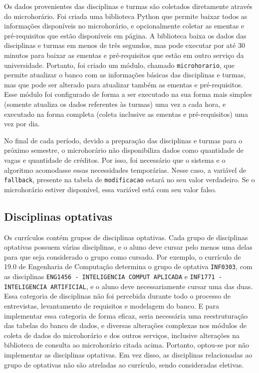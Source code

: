 

Os dados provenientes das disciplinas e turmas são coletados diretamente através do microhorário. Foi criada uma biblioteca Python que permite baixar todos as informações disponíveis no microhorário, e opcionalmente coletar as ementas e pré-requisitos que estão disponíveis em página. A biblioteca baixa os dados das disciplinas e turmas em menos de três segundos, mas pode executar por até 30 minutos para baixar as ementas e pré-requisitos que estão em outro serviço da universidade. Portanto, foi criado um módulo, chamado \verb|microhorario|, que permite atualizar o banco com as informações básicas das disciplinas e turmas, mas que pode ser alterado para atualizar também as ementas e pré-requisitos. Esse módulo foi configurado de forma a ser executado na sua forma mais simples (somente atualiza os dados referentes às turmas) uma vez a cada hora, e executado na forma completa (coleta inclusive as ementas e pré-requisitos) uma vez por dia.

No final de cada período, devido a preparação das disciplinas e turmas para o próximo semestre, o microhorário não disponibiliza dados como quantidade de vagas e quantidade de créditos. Por isso, foi necessário que o sistema e o algoritmo acomodasse essas necessidades temporárias. Nesse caso, a variável de \verb|fallback|, presente na tabela de \verb|modificacao| estará no seu valor verdadeiro. Se o microhorário estiver disponível, essa variável está com seu valor falso.

\subsection{Disciplinas optativas}
Os currículos contém grupos de disciplinas optativas. Cada grupo de disciplinas optativas possuem várias disciplinas, e o aluno deve cursar pelo menos uma delas para que seja considerado o grupo como cursado. Por exemplo, o currículo de 19.0 de Engenharia de Computação determina o grupo de optativa \verb|INF0303|, com as disciplinas \verb|ENG1456 - INTELIGENCIA COMPUT APLICADA| e \verb|INF1771 - INTELIGENCIA ARTIFICIAL|, e o aluno deve necessariamente cursar uma das duas. Essa categoria de disciplinas não foi percebida durante todo o processo de entrevistas, levantamento de requisitos e modelagem do banco. E para implementar essa categoria de forma eficaz, seria necessária uma reestruturação das tabelas do banco de dados, e diversas alterações complexas nos módulos de coleta de dados do microhorário e dos outros serviços, inclusive alterações na biblioteca de consulta ao microhorário citada acima. Portanto, optou-se por não implementar as disciplinas optativas. Em vez disso, as disciplinas relacionadas ao grupo de optativas não são atreladas ao currículo, sendo consideradas eletivas.

